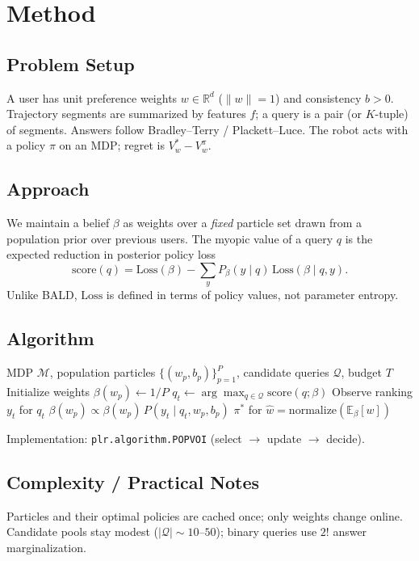 \section{Method}
\label{sec:method}


\subsection{Problem Setup}
\label{sec:setup}
A user has unit preference weights $w\in\mathbb{R}^d$ ($\lVert w\rVert=1$) and
consistency $b>0$.
Trajectory segments are summarized by features $f$; a query is a pair (or $K$-tuple)
of segments.
Answers follow Bradley--Terry / Plackett--Luce.
The robot acts with a policy $\pi$ on an MDP; regret is
$V^*_w - V^{\pi}_w$.

\subsection{Approach}
\label{sec:approach}
We maintain a belief $\beta$ as weights over a \emph{fixed} particle set drawn from a
population prior over previous users.
The myopic value of a query $q$ is the expected reduction in posterior policy loss
\[
\mathrm{score}(q)
=
\mathrm{Loss}(\beta)
-
\sum_y P_\beta(y\mid q)\,
\mathrm{Loss}(\beta\mid q,y).
\]
Unlike BALD, $\mathrm{Loss}$ is defined in terms of policy values, not parameter
entropy.

\subsection{Algorithm}
\label{sec:algorithm}
\begin{algorithm}[t]
\caption{POP-VOI (population-prior regret VOI elicitation)}
\label{alg:popvoi}
\begin{algorithmic}[1]
  \Require MDP $\mathcal{M}$, population particles $\{(w_p,b_p)\}_{p=1}^P$,
           candidate queries $\mathcal{Q}$, budget $T$
  \State Initialize weights $\beta(w_p)\leftarrow 1/P$
    \State $q_t \leftarrow \arg\max_{q\in\mathcal{Q}} \mathrm{score}(q;\beta)$
    \State Observe ranking $y_t$ for $q_t$
    \State $\beta(w_p)\propto \beta(w_p)\,P(y_t\mid q_t,w_p,b_p)$
  \EndFor
  \State \Return $\pi^*$ for $\hat w=\mathrm{normalize}(\mathbb{E}_\beta[w])$
\end{algorithmic}
\end{algorithm}

Implementation: \texttt{plr.algorithm.POPVOI}
(select $\rightarrow$ update $\rightarrow$ decide).

\subsection{Complexity / Practical Notes}
Particles and their optimal policies are cached once; only weights change online.
Candidate pools stay modest ($|\mathcal{Q}|\!\sim\!10$--$50$); binary queries use
$2!$ answer marginalization.
